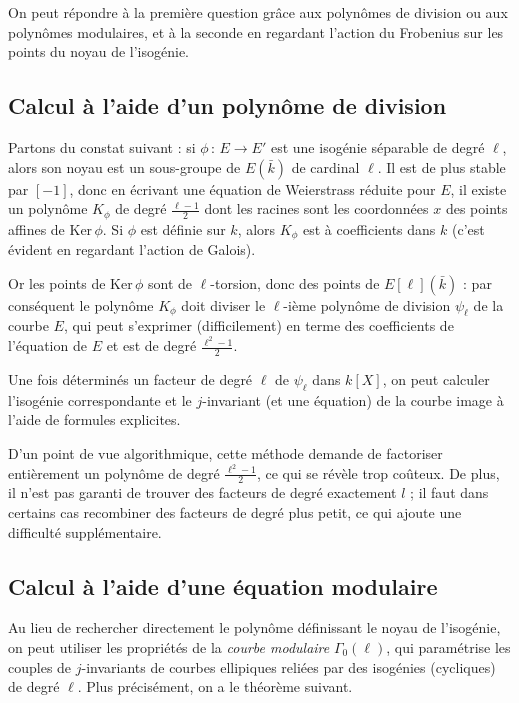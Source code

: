 \documentclass[11pt,a4paper]{article}
\newcommand{\vers}{\rightarrow}
\newcommand{\de}{\,:\,}
\theoremstyle{definition}
\begin{document}
On peut répondre à la première question grâce aux polynômes de division ou aux polynômes modulaires, et à la seconde en regardant l'action du Frobenius sur les points du noyau de l'isogénie.

\subsection{Calcul à l'aide d'un polynôme de division}

Partons du constat suivant : si $\phi\de E\vers E'$ est une isogénie séparable de degré $\ell$, alors son noyau est un sous-groupe de $E(\bar{k})$ de cardinal $\ell$. Il est de plus stable par $[-1]$, donc en écrivant une équation de Weierstrass réduite pour $E$, il existe un polynôme $K_\phi$ de degré $\frac{\ell-1}{2}$ dont les racines sont les coordonnées $x$ des points affines de Ker\,$\phi$. Si $\phi$ est définie sur $k$, alors $K_\phi$ est à coefficients dans $k$ (c'est évident en regardant l'action de Galois).

Or les points de Ker\,$\phi$ sont de $\ell$-torsion, donc des points de $E[\ell](\bar{k})$ : par conséquent le polynôme $K_\phi$ doit diviser le $\ell$-ième polynôme de division $\psi_\ell$ de la courbe $E$, qui peut s'exprimer (difficilement) en terme des coefficients de l'équation de $E$ et est de degré $\frac{\ell^2-1}{2}$.

Une fois déterminés un facteur de degré $\ell$ de $\psi_\ell$ dans $k[X]$, on peut calculer l'isogénie correspondante et le $j$-invariant (et une équation) de la courbe image à l'aide de formules explicites.

D'un point de vue algorithmique, cette méthode demande de factoriser entièrement un polynôme de degré $\frac{\ell^2-1}{2}$, ce qui se révèle trop coûteux. De plus, il n'est pas garanti de trouver des facteurs de degré exactement $l$ ; il faut dans certains cas recombiner des facteurs de degré plus petit, ce qui ajoute une difficulté supplémentaire.

\subsection{Calcul à l'aide d'une équation modulaire}

Au lieu de rechercher directement le polynôme définissant le noyau de l'isogénie, on peut utiliser les propriétés de la \emph{courbe modulaire} $\Gamma_0(\ell)$, qui paramétrise les couples de $j$-invariants de courbes ellipiques reliées par des isogénies (cycliques) de degré $\ell$. Plus précisément, on a le théorème suivant.
\end{document}
